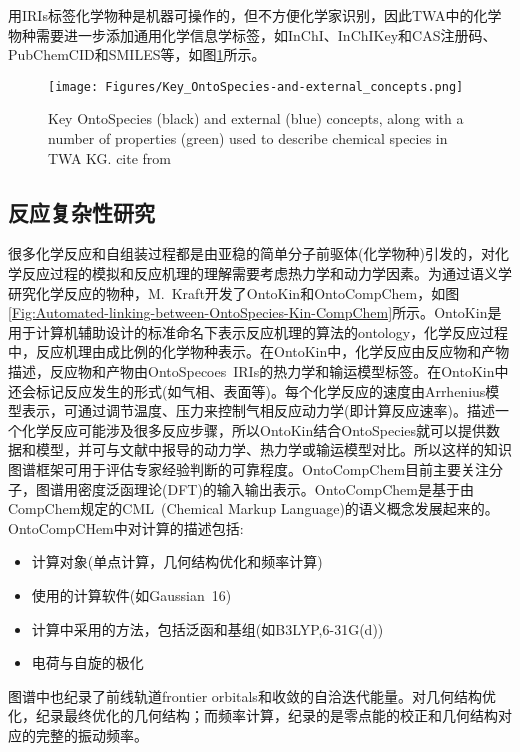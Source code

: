 用\textrm{IRIs}标签化学物种是机器可操作的，但不方便化学家识别，因此\textrm{TWA}中的化学物种需要进一步添加通用化学信息学标签，如\textrm{\textrm{InChI}}、\textrm{InChIKey}和\textrm{CAS}注册码、\textrm{PubChemCID}和\textrm{SMILES}等，如图\ref{Fig:Key-OntoSpecies-and-external-concepts}所示。
\begin{figure}[h!]
\centering
\texttt{[image: Figures/Key\_OntoSpecies-and-external\_concepts.png]}
\caption{\small\textrm{Key OntoSpecies (black) and external (blue) concepts, along with a number of properties (green) used to describe chemical species in TWA KG. cite from~\cite{ACR56-128_2023}}}%
\label{Fig:Key-OntoSpecies-and-external-concepts}
\end{figure}

\subsection{反应复杂性研究}
很多化学反应和自组装过程都是由亚稳的简单分子前驱体(化学物种)引发的，对化学反应过程的模拟和反应机理的理解需要考虑热力学和动力学因素。为通过语义学研究化学反应的物种，\textrm{M.~Kraft}开发了\textrm{OntoKin}和\textrm{OntoCompChem}，如图\ref{Fig:Automated-linking-between-OntoSpecies-Kin-CompChem}所示。\textrm{OntoKin}是用于计算机辅助设计的标准命名下表示反应机理的算法的\textrm{ontology}，化学反应过程中，反应机理由成比例的化学物种表示。在\textrm{OntoKin}中，化学反应由反应物和产物描述，反应物和产物由\textrm{OntoSpecoes~IRIs}的热力学和输运模型标签。在\textrm{OntoKin}中还会标记反应发生的形式(如气相、表面等)。每个化学反应的速度由\textrm{Arrhenius}模型表示，可通过调节温度、压力来控制气相反应动力学(即计算反应速率)。描述一个化学反应可能涉及很多反应步骤，所以\textrm{OntoKin}结合\textrm{OntoSpecies}就可以提供数据和模型，并可与文献中报导的动力学、热力学或输运模型对比。所以这样的知识图谱框架可用于评估专家经验判断的可靠程度。\textrm{OntoCompChem}目前主要关注分子，图谱用密度泛函理论\textrm{(DFT)}的输入输出表示。\textrm{OntoCompChem}是基于由\textrm{CompChem}规定的\textrm{CML~(Chemical Markup Language)}的语义概念发展起来的。\textrm{OntoCompCHem}中对计算的描述包括:
\begin{itemize}
	\item 计算对象(单点计算，几何结构优化和频率计算)
	\item 使用的计算软件(如\textrm{Gaussian~16})
	\item 计算中采用的方法，包括泛函和基组(如\textrm{B3LYP,6-31G(d)})
	\item 电荷与自旋的极化
\end{itemize}
图谱中也纪录了前线轨道\textrm{frontier orbitals}和收敛的自洽迭代能量。对几何结构优化，纪录最终优化的几何结构；而频率计算，纪录的是零点能的校正和几何结构对应的完整的振动频率。

